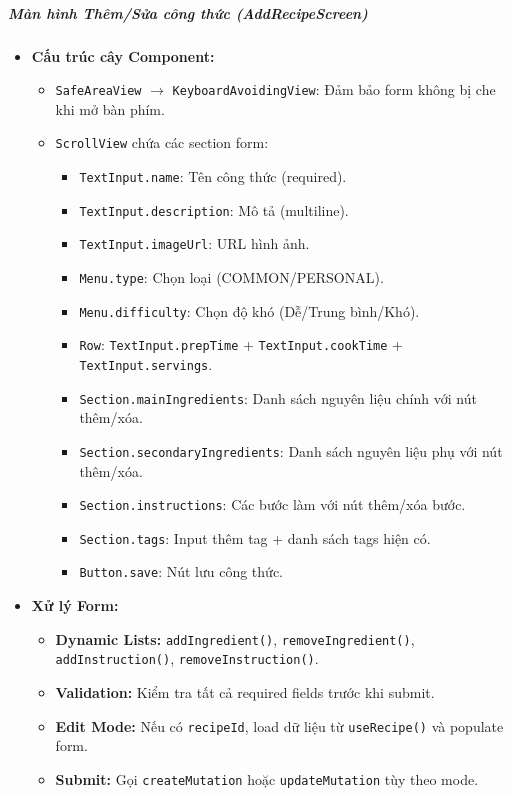 \subparagraph{Màn hình Thêm/Sửa công thức (AddRecipeScreen)}
\begin{itemize}
    \item \textbf{Cấu trúc cây Component:}
        \begin{itemize}
            \item \texttt{SafeAreaView} $\rightarrow$ \texttt{KeyboardAvoidingView}: Đảm bảo form không bị che khi mở bàn phím.
            \item \texttt{ScrollView} chứa các section form:
                \begin{itemize}
                    \item \texttt{TextInput.name}: Tên công thức (required).
                    \item \texttt{TextInput.description}: Mô tả (multiline).
                    \item \texttt{TextInput.imageUrl}: URL hình ảnh.
                    \item \texttt{Menu.type}: Chọn loại (COMMON/PERSONAL).
                    \item \texttt{Menu.difficulty}: Chọn độ khó (Dễ/Trung bình/Khó).
                    \item \texttt{Row}: \texttt{TextInput.prepTime} + \texttt{TextInput.cookTime} + \texttt{TextInput.servings}.
                    \item \texttt{Section.mainIngredients}: Danh sách nguyên liệu chính với nút thêm/xóa.
                    \item \texttt{Section.secondaryIngredients}: Danh sách nguyên liệu phụ với nút thêm/xóa.
                    \item \texttt{Section.instructions}: Các bước làm với nút thêm/xóa bước.
                    \item \texttt{Section.tags}: Input thêm tag + danh sách tags hiện có.
                    \item \texttt{Button.save}: Nút lưu công thức.
                \end{itemize}
        \end{itemize}
    \item \textbf{Xử lý Form:}
        \begin{itemize}
            \item \textbf{Dynamic Lists:} \texttt{addIngredient()}, \texttt{removeIngredient()}, \texttt{addInstruction()}, \texttt{removeInstruction()}.
            \item \textbf{Validation:} Kiểm tra tất cả required fields trước khi submit.
            \item \textbf{Edit Mode:} Nếu có \texttt{recipeId}, load dữ liệu từ \texttt{useRecipe()} và populate form.
            \item \textbf{Submit:} Gọi \texttt{createMutation} hoặc \texttt{updateMutation} tùy theo mode.
        \end{itemize}
\end{itemize}
